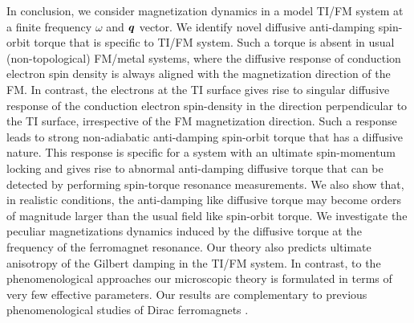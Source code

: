 In conclusion, we consider magnetization dynamics in a model TI/FM system at a finite frequency $\omega$ and $\boldsymbol{q}$ vector. We identify novel diffusive anti-damping spin-orbit torque that is specific to TI/FM system.  Such a torque is absent in usual (non-topological) FM/metal systems, where the diffusive response of conduction electron spin density is always aligned with the magnetization direction of the FM. In contrast, the electrons at the TI surface gives rise to singular diffusive response of the conduction electron spin-density in the direction perpendicular to the TI surface, irrespective of the FM magnetization direction. Such a response leads to strong non-adiabatic anti-damping spin-orbit torque that has a diffusive nature. This response is specific for a system with an ultimate spin-momentum locking and gives rise to abnormal anti-damping diffusive torque that can be detected by performing spin-torque resonance measurements. We also show that, in realistic conditions, the anti-damping like diffusive torque may become orders of magnitude larger than the usual field like spin-orbit torque. We investigate the peculiar magnetizations dynamics induced by the diffusive torque at the frequency of the ferromagnet resonance. Our theory also predicts ultimate anisotropy of the Gilbert damping in the TI/FM system. In contrast, to the phenomenological approaches \cite{vanderBijl2012,Hals2013} our microscopic theory is formulated in terms of very few effective parameters. Our results are complementary to previous phenomenological studies of Dirac ferromagnets \cite{tserkovnyak_theory_2009,mahfouzi_spin-orbit_2012,katsnelson15,fischer_spin-torque_2016,yokoyama_theoretical_2010,yokoyama_current-induced_2011,siu_spin_2016,mahfouzi_antidamping_2016,soleimani_spin-orbit_2017,kurebayashi_microscopic_2017,chen_current-induced_2017,rodriguez-vega_giant_2016,qi_topological_2008,garate_inverse_2010,yokoyama_theoretical_2010,yokoyama_current-induced_2011,nomura_electric_2010,tserkovnyak_thin-film_2012-1,linder_improved_2014,tserkovnyak_spin_2015,ueda_topological_2012,liu_reading_2013,chang_nonequilibrium_2015,fischer_spin-torque_2016,mahfouzi_antidamping_2016,fujimoto_transport_2014,okuma_unconventional_2016}.

